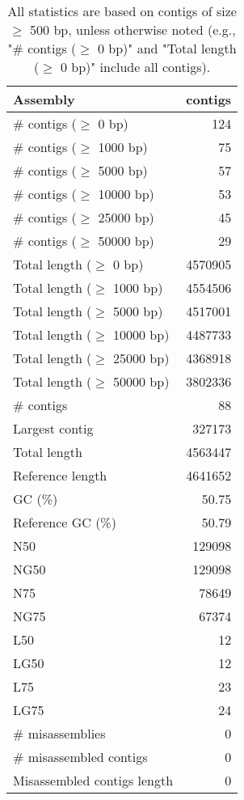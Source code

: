 \documentclass[12pt,a4paper]{article}
\begin{document}
\begin{table}[ht]
\begin{center}
\caption{All statistics are based on contigs of size $\geq$ 500 bp, unless otherwise noted (e.g., "\# contigs ($\geq$ 0 bp)" and "Total length ($\geq$ 0 bp)" include all contigs).}
\begin{tabular}{|l*{1}{|r}|}
\hline
Assembly & contigs \\ \hline
\# contigs ($\geq$ 0 bp) & 124 \\ \hline
\# contigs ($\geq$ 1000 bp) & 75 \\ \hline
\# contigs ($\geq$ 5000 bp) & 57 \\ \hline
\# contigs ($\geq$ 10000 bp) & 53 \\ \hline
\# contigs ($\geq$ 25000 bp) & 45 \\ \hline
\# contigs ($\geq$ 50000 bp) & 29 \\ \hline
Total length ($\geq$ 0 bp) & 4570905 \\ \hline
Total length ($\geq$ 1000 bp) & 4554506 \\ \hline
Total length ($\geq$ 5000 bp) & 4517001 \\ \hline
Total length ($\geq$ 10000 bp) & 4487733 \\ \hline
Total length ($\geq$ 25000 bp) & 4368918 \\ \hline
Total length ($\geq$ 50000 bp) & 3802336 \\ \hline
\# contigs & 88 \\ \hline
Largest contig & 327173 \\ \hline
Total length & 4563447 \\ \hline
Reference length & 4641652 \\ \hline
GC (\%) & 50.75 \\ \hline
Reference GC (\%) & 50.79 \\ \hline
N50 & 129098 \\ \hline
NG50 & 129098 \\ \hline
N75 & 78649 \\ \hline
NG75 & 67374 \\ \hline
L50 & 12 \\ \hline
LG50 & 12 \\ \hline
L75 & 23 \\ \hline
LG75 & 24 \\ \hline
\# misassemblies & 0 \\ \hline
\# misassembled contigs & 0 \\ \hline
Misassembled contigs length & 0 \\ \hline

\end{tabular}
\end{center}
\end{table}
\end{document}
